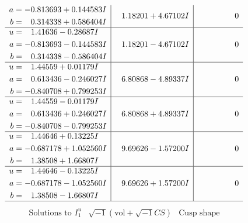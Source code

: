 \documentclass[1p]{elsarticle_modified}
\theoremstyle{definition}
\newcommand{\I}{\sqrt{-1}}
\begin{document}
$$\begin{array}{c|c|c}
\begin{aligned}
a &= -0.813693 + 0.144583 I \\
b &= \phantom{-}0.314338 + 0.586404 I\end{aligned}
 & \phantom{-}1.18201 + 4.67102 I & \phantom{-0.000000 } 0 \\ \hline\begin{aligned}
u &= \phantom{-}1.41636 - 0.28687 I \\
a &= -0.813693 - 0.144583 I \\
b &= \phantom{-}0.314338 - 0.586404 I\end{aligned}
 & \phantom{-}1.18201 - 4.67102 I & \phantom{-0.000000 } 0 \\ \hline\begin{aligned}
u &= \phantom{-}1.44559 + 0.01179 I \\
a &= \phantom{-}0.613436 - 0.246027 I \\
b &= -0.840708 + 0.799253 I\end{aligned}
 & \phantom{-}6.80868 - 4.89337 I & \phantom{-0.000000 } 0 \\ \hline\begin{aligned}
u &= \phantom{-}1.44559 - 0.01179 I \\
a &= \phantom{-}0.613436 + 0.246027 I \\
b &= -0.840708 - 0.799253 I\end{aligned}
 & \phantom{-}6.80868 + 4.89337 I & \phantom{-0.000000 } 0 \\ \hline\begin{aligned}
u &= \phantom{-}1.44646 + 0.13225 I \\
a &= -0.687178 + 1.052560 I \\
b &= \phantom{-}1.38508 + 1.66807 I\end{aligned}
 & \phantom{-}9.69626 - 1.57200 I & \phantom{-0.000000 } 0 \\ \hline\begin{aligned}
u &= \phantom{-}1.44646 - 0.13225 I \\
a &= -0.687178 - 1.052560 I \\
b &= \phantom{-}1.38508 - 1.66807 I\end{aligned}
 & \phantom{-}9.69626 + 1.57200 I & \phantom{-0.000000 } 0\\
 \hline 
 \end{array}$$\newpage$$\begin{array}{c|c|c}  
\text{Solutions to }I^u_{1}& \I (\text{vol} + \sqrt{-1}CS) & \text{Cusp shape}\\
 \hline 
\begin{aligned}

\end{aligned}
\end{array}$$
\end{document}
